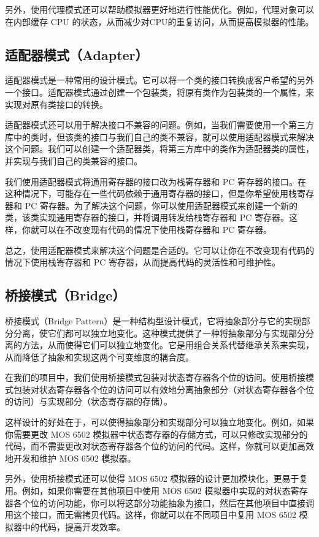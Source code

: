 \documentclass[cn,black,12pt,normal]{elegantnote}
\begin{document}
另外，使用代理模式还可以帮助模拟器更好地进行性能优化。例如，代理对象可以在内部缓存 CPU 的状态，从而减少对CPU的重复访问，从而提高模拟器的性能。

\subsection{适配器模式（Adapter）}

适配器模式是一种常用的设计模式。它可以将一个类的接口转换成客户希望的另外一个接口。适配器模式通过创建一个包装类，将原有类作为包装类的一个属性，来实现对原有类接口的转换。

适配器模式还可以用于解决接口不兼容的问题。例如，当我们需要使用一个第三方库中的类时，但该类的接口与我们自己的类不兼容，就可以使用适配器模式来解决这个问题。我们可以创建一个适配器类，将第三方库中的类作为适配器类的属性，并实现与我们自己的类兼容的接口。

我们使用适配器模式将通用寄存器的接口改为栈寄存器和 PC 寄存器的接口。在这种情况下，可能存在一些代码依赖于通用寄存器的接口，但是你希望使用栈寄存器和 PC 寄存器。为了解决这个问题，你可以使用适配器模式来创建一个新的类，该类实现通用寄存器的接口，并将调用转发给栈寄存器和 PC 寄存器。这样，你就可以在不改变现有代码的情况下使用栈寄存器和 PC 寄存器。

总之，使用适配器模式来解决这个问题是合适的。它可以让你在不改变现有代码的情况下使用栈寄存器和 PC 寄存器，从而提高代码的灵活性和可维护性。


\subsection{桥接模式（Bridge）}

桥接模式（Bridge Pattern）是一种结构型设计模式，它将抽象部分与它的实现部分分离，使它们都可以独立地变化。这种模式提供了一种将抽象部分与实现部分分离的方法，从而使得它们可以独立地变化。它是用组合关系代替继承关系来实现，从而降低了抽象和实现这两个可变维度的耦合度。

在我们的项目中，我们使用桥接模式包装对状态寄存器各个位的访问。使用桥接模式包装对状态寄存器各个位的访问可以有效地分离抽象部分（对状态寄存器各个位的访问）与实现部分（状态寄存器的存储）。

这样设计的好处在于，可以使得抽象部分和实现部分可以独立地变化。例如，如果你需要更改 MOS 6502 模拟器中状态寄存器的存储方式，可以只修改实现部分的代码，而不需要更改对状态寄存器各个位的访问的代码。这样，你就可以更加高效地开发和维护 MOS 6502 模拟器。

另外，使用桥接模式还可以使得 MOS 6502 模拟器的设计更加模块化，更易于复用。例如，如果你需要在其他项目中使用 MOS 6502 模拟器中实现的对状态寄存器各个位的访问功能，你可以将这部分功能抽象为接口，然后在其他项目中直接调用这个接口，而无需拷贝代码。这样，你就可以在不同项目中复用 MOS 6502 模拟器中的代码，提高开发效率。
\end{document}
